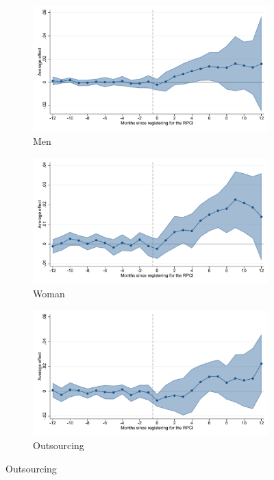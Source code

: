 \begin{figure}[H]
    \centering
    \caption{Event studies - RPCI effect on log wage}
    
    \begin{subfigure}{0.32\textwidth}
    \caption{Men}
    \includegraphics[width=\textwidth]{04_Figures/muestra_10porciento/event_study_log_sal_cierre_hombre_dcdh_connected.pdf}
    \end{subfigure}
    \begin{subfigure}{0.32\textwidth}
    \caption{Woman}
    \includegraphics[width=\textwidth]{04_Figures/muestra_10porciento/event_study_log_sal_cierre_mujer_dcdh_connected.pdf}
    \end{subfigure}
    \begin{subfigure}{0.32\textwidth}
    \caption{Outsourcing}
    \includegraphics[width=\textwidth]{04_Figures/muestra_10porciento/event_study_log_sal_cierre_base_outsourcing_dcdh_connected.pdf}
    \end{subfigure}
    

\end{figure}
